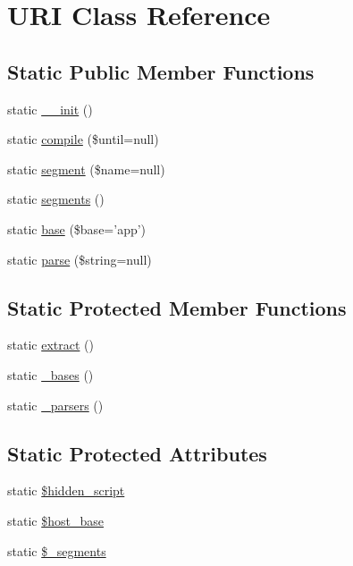 \hypertarget{class_u_r_i}{\section{U\-R\-I Class Reference}
\label{class_u_r_i}
}
\subsection*{Static Public Member Functions}
\begin{DoxyCompactItemize}
\item 
static \hyperlink{class_u_r_i_a60ef5aca27d7fc8bd1016c257795351d}{\-\_\-\-\_\-init} ()
\item 
static \hyperlink{class_u_r_i_a60ca24bd19f67a822dd2cbee04b196b8}{compile} (\$until=null)
\item 
static \hyperlink{class_u_r_i_ae8403875a4b3a41c0e23b014f0144ce9}{segment} (\$name=null)
\item 
static \hyperlink{class_u_r_i_a000728309ac3ab058d70f51f9f2215a7}{segments} ()
\item 
static \hyperlink{class_u_r_i_a85dfb08b7aaf8ff1f94fcab77e66ec28}{base} (\$base='app')
\item 
static \hyperlink{class_u_r_i_a9b345db671537e66c8f33b657a703caf}{parse} (\$string=null)
\end{DoxyCompactItemize}
\subsection*{Static Protected Member Functions}
\begin{DoxyCompactItemize}
\item 
static \hyperlink{class_u_r_i_a3219880085757e8aba2f87ed03493890}{extract} ()
\item 
static \hyperlink{class_u_r_i_a760619fce395f4499f4c70d1820d1b24}{\-\_\-bases} ()
\item 
static \hyperlink{class_u_r_i_a823a4d6d301c5554d554e3ee4a2093ab}{\-\_\-parsers} ()
\end{DoxyCompactItemize}
\subsection*{Static Protected Attributes}
\begin{DoxyCompactItemize}
\item 
static \hyperlink{class_u_r_i_a146bad116724a28764ebbddf732e375a}{\$hidden\-\_\-script}
\item 
static \hyperlink{class_u_r_i_ad6887658f2dc46d491a319774ed6ccaa}{\$host\-\_\-base}
\item 
static \hyperlink{class_u_r_i_aa55c732bc18612d66602f5fc47f7887c}{\$\-\_\-segments}
\end{DoxyCompactItemize}


